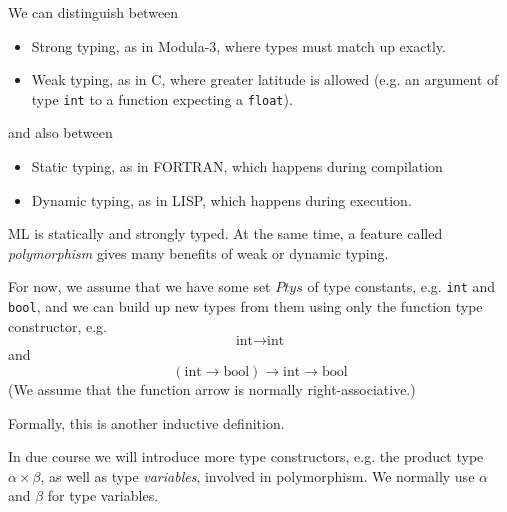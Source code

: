 \begin{slide*}


\vspace*{0.4cm}

We can distinguish between

\begin{itemize}

\item Strong typing, as in Modula-3, where types must match up exactly.

\item Weak typing, as in C, where greater latitude is allowed (e.g. an argument
of type {\tt int} to a function expecting a {\tt float}).

\end{itemize}

and also between

\begin{itemize}

\item Static typing, as in FORTRAN, which happens during compilation

\item Dynamic typing, as in LISP, which happens during execution.

\end{itemize}

ML is statically and strongly typed. At the same time, a feature called {\em
polymorphism} gives many benefits of weak or dynamic typing.

\end{slide*}


\begin{slide*}


\vspace*{0.5cm}

For now, we assume that we have some set {\red $Ptys$} of type constants, e.g.
{\red \tt int} and {\red \tt bool}, and we can build up new types from them
using only the function type constructor, e.g.
{\red $$ \mbox{int} \to \mbox{int} $$}
and
{\red $$ (\mbox{int} \to \mbox{bool}) \to \mbox{int} \to \mbox{bool} $$}
(We assume that the function arrow is normally right-associative.)

Formally, this is another inductive definition.

In due course we will introduce more type constructors, e.g. the product type
{\red $\alpha \times \beta$}, as well as type {\em variables}, involved in
polymorphism. We normally use {\red $\alpha$} and {\red $\beta$} for type
variables.

\end{slide*}



